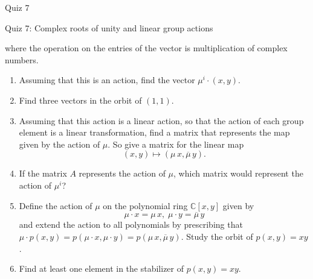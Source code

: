 \documentclass[12pt]{article}
\begin{document}
\begin{quiz}{Quiz 7}
\begin{essay}[response field lines=5,attachments allowed=0]{Quiz 7: Complex roots of unity and linear group actions}
\begin{enumerate}
where the operation on the entries of the vector is multiplication of complex numbers.
\begin{enumerate}
\item Assuming that this is an action, find the vector $\mu^i \cdotp (x , y)$.
\item Find three vectors in the orbit of $(1,1)$.
\item Assuming that this action is a linear action, so that the action of each group element is a linear transformation, find a matrix that represents the map given by the action of $\mu $. So give a matrix for the linear map 
\[  (x , y) \mapsto  (\mu \,  x , \overline{\mu} \,   y). \]
\item If the matrix $A$ represents the action of $\mu$, which matrix would represent the action of $\mu^i$?
\item Define the action of $\mu $ on the polynomial ring $\mathbb{C}[x,y]$ given by 
\[ \mu  \cdotp x = \mu \,  x , \; \mu  \cdotp y = \overline{\mu} \,   y \]
and extend the action to all polynomials by prescribing that $\mu  \cdotp p(x,y) = p(\mu  \cdotp x, \mu  \cdotp y) = p(\mu\,   x , \overline{\mu} \,   y)$. Study the orbit of $p(x,y)=xy$.
\item Find at least one element in the stabilizer of  $p(x,y)=xy$.
    \end{enumerate} 
    \end{enumerate}
\end{essay}
\end{quiz}
\end{document}
